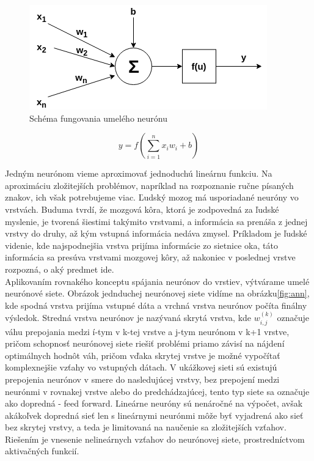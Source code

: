 \begin{figure}[H]
	\centering
	\includegraphics[width=0.7\linewidth]{img/artneuron}
	\caption{Schéma fungovania umelého neurónu}
	\label{fig:artneuron}
\end{figure}

\begin{equation}\label{eqn:artneuron}
y = f(\sum\limits_{i=1}^n x_{i}w_{i} + b)
\end{equation}

\indent Jedným neurónom vieme aproximovať jednoduchú lineárnu funkciu.
Na aproximáciu zložitejších problémov, napríklad na rozpoznanie ručne písaných znakov, ich však potrebujeme viac.
Ľudský mozog má usporiadané neuróny vo vrstvách.
Buduma tvrdí, že mozgová kôra, ktorá je zodpovedná za ľudské myslenie, je tvorená šiestimi takýmito vrstvami\cite{buduma2017fundamentals}, a informácia sa prenáša z jednej vrstvy do druhy, až kým vstupná informácia nedáva zmysel.
Príkladom je ľudské videnie, kde najspodnejšia vrstva prijíma informácie zo sietnice oka, táto informácia sa presúva vrstvami mozgovej kôry, až nakoniec v poslednej vrstve rozpozná, o aký predmet ide.\\

\indent Aplikovaním rovnakého konceptu spájania neurónov do vrstiev, výtvárame umelé neurónové siete.
Obrázok jednduchej neurónovej siete vidíme na obrázku\ref{fig:ann}, kde spodná vrstva prijíma vstupné dáta a vrchná vrstva neurónov počíta finálny výsledok.
Stredná vrstva neurónov je nazývaná skrytá vrstva, kde $w_{i, j}^{(k)}$ označuje váhu prepojania medzi í-tym v k-tej vrstve a j-tym neurónom v k+1 vrstve, pričom schopnosť neurónovej siete riešiť problémi 
priamo závisí na nájdení optimálnych hodnôt váh, pričom vďaka skrytej vrstve je možné vypočítať komplexnejšie vzťahy vo vstupných dátach.
V ukážkovej sieti sú existujú prepojenia neurónov v smere do nasledujúcej vrstvy, bez prepojení medzi neurónmi v rovnakej vrstve alebo do predchádzajúcej, tento typ siete sa označuje ako dopredná - feed forward.
Lineárne neuróny sú nenáročné na výpočet, avšak akákoľvek dopredná sieť len s lineárnymi neurónmi môže byť vyjadrená ako sieť bez skrytej vrstvy, a teda je limitovaná na naučenie sa zložitejších vzťahov.
Riešením je vnesenie nelineárnych vzťahov do neurónovej siete, prostredníctvom aktivačných funkcií.\cite{buduma2017fundamentals}

